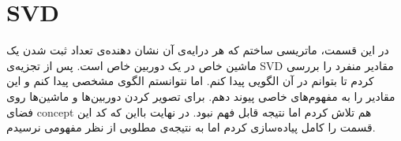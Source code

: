 \section{SVD}

در این قسمت، ماتریسی ساختم که هر درایه‌ی آن نشان دهنده‌ی تعداد ثبت شدن یک 
ماشین خاص در یک دوربین خاص است. پس از تجزیه‌ی 
SVD
مقادیر منفرد را بررسی کردم تا بتوانم در آن الگویی پیدا کنم. اما 
نتوانستم الگوی مشخصی پیدا کنم و این مقادیر را به مفهوم‌های خاصی پیوند دهم. 
برای تصویر کردن دوربین‌ها و ماشین‌ها روی فضای 
concept 
هم تلاش کردم اما نتیجه قابل فهم نبود. در نهایت بااین که کد این قسمت را 
کامل پیاده‌سازی کردم اما به نتیجه‌ی مطلوبی از نظر مفهومی نرسیدم. 